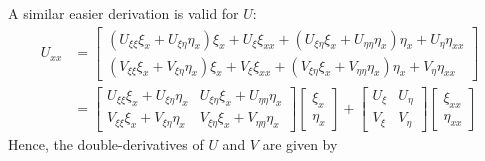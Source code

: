 \documentclass[final,1p,times]{elsarticle}
\begin{document}
A similar easier derivation is valid for $U$:
\begin{align*}
U_{xx}	&= \begin{bmatrix} (U_{\xi\xi}\xi_x+U_{\xi\eta}\eta_x)\xi_x+U_{\xi}\xi_{xx}+(U_{\xi\eta}\xi_x+U_{\eta\eta}\eta_x)\eta_x+U_{\eta}\eta_{xx} \\ (V_{\xi\xi}\xi_x+V_{\xi\eta}\eta_x)\xi_x+V_{\xi}\xi_{xx}+(V_{\xi\eta}\xi_x+V_{\eta\eta}\eta_x)\eta_x+V_{\eta}\eta_{xx} \end{bmatrix} \\
		&= \begin{bmatrix} U_{\xi\xi}\xi_x+U_{\xi\eta}\eta_x & U_{\xi\eta}\xi_x+U_{\eta\eta}\eta_x \\ V_{\xi\xi}\xi_x+V_{\xi\eta}\eta_x & V_{\xi\eta}\xi_x+V_{\eta\eta}\eta_x \end{bmatrix}\begin{bmatrix}\xi_x \\ \eta_x \end{bmatrix} + \begin{bmatrix} U_{\xi} & U_{\eta} \\ V_{\xi} & V_{\eta} \end{bmatrix}\begin{bmatrix}\xi_{xx} \\ \eta_{xx} \end{bmatrix}
\end{align*}
Hence, the double-derivatives of $U$ and $V$ are given by
\end{document}
